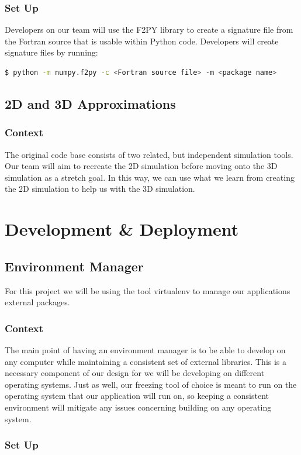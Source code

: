 \documentclass[onecolumn, draftclsnofoot,10pt, compsoc]{IEEEtran}
\begin{document}
\subsubsection{Set Up}
Developers on our team will use the F2PY library to create a signature file from the Fortran source that is usable within Python code. Developers will create signature files by running:
\begin{lstlisting}[language=bash]
  $ python -m numpy.f2py -c <Fortran source file> -m <package name>
\end{lstlisting}


\subsection{2D and 3D Approximations}
\subsubsection{Context}
The original code base consists of two related, but independent simulation tools. Our team will aim to recreate the 2D simulation before moving onto the 3D simulation as a stretch goal. In this way, we can use what we learn from creating the 2D simulation to help us with the 3D simulation. 


\section{Development \& Deployment}
\subsection{Environment Manager}

For this project we will be using the tool virtualenv to manage our applications external packages.

\subsubsection{Context}
The main point of having an environment manager is to be able to develop on any computer while maintaining a consistent set of external libraries. This is a necessary component of our design for we will be developing on different operating systems. Just as well, our freezing tool of choice is meant to run on the operating system that our application will run on, so keeping a consistent environment will mitigate any issues concerning building on any operating system. 
\subsubsection{Set Up}
\end{document}
